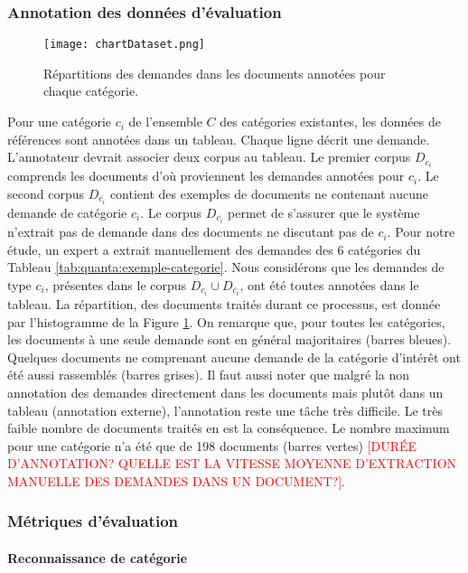 \subsubsection{Annotation des données d'évaluation}
\begin{figure}[h!]
	\texttt{[image: chartDataset.png]}
	\caption{Répartitions des demandes dans les documents annotées pour chaque catégorie.}\label{fig:quanta:hist-repartition-docs}
\end{figure}
Pour une catégorie $c_i$ de l'ensemble $C$ des catégories existantes, les données de références sont annotées dans un tableau. Chaque ligne décrit une demande. L'annotateur devrait associer deux corpus au tableau. Le premier corpus $D_{c_i}$ comprends les documents d'où proviennent les demandes annotées pour $c_i$. Le second corpus $D_{\overline{c_i}}$ contient des exemples de documents ne contenant aucune demande de catégorie $c_i$. Le corpus $D_{\overline{c_i}}$ permet de s'assurer que le système n'extrait pas de demande dans des documents ne discutant pas de $c_i$.  Pour notre étude, un expert a extrait manuellement des demandes des 6 catégories du Tableau \ref{tab:quanta:exemple-categorie}. Nous considérons que les demandes de type $c_i$, présentes dans le corpus $D_{c_i} \cup D_{\overline{c_i}}$, ont été toutes annotées dans le tableau. La répartition, des documents traités durant ce processus, est donnée par l'histogramme de la Figure \ref{fig:quanta:hist-repartition-docs}.  On remarque que, pour toutes les catégories, les documents à une seule demande sont en général majoritaires (barres bleues). Quelques documents ne comprenant aucune demande de la catégorie d'intérêt ont été aussi rassemblés (barres grises). Il faut aussi noter que malgré la non annotation des demandes directement dans les documents mais plutôt dans un tableau (annotation externe), l'annotation reste une tâche très difficile. Le très faible nombre de documents traités en est la conséquence. Le nombre  maximum pour une catégorie n'a été que de 198 documents (barres vertes) \textcolor{red}{[DURÉE D'ANNOTATION? QUELLE EST LA VITESSE MOYENNE D'EXTRACTION MANUELLE DES DEMANDES DANS UN DOCUMENT?]}.



\subsubsection{Métriques d'évaluation}
\paragraph{Reconnaissance de catégorie}

